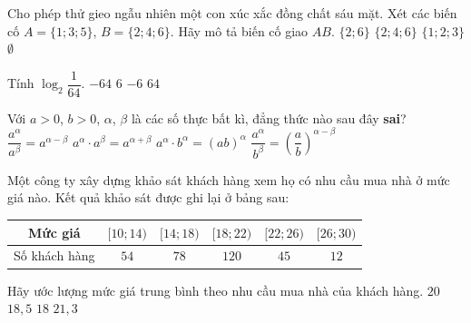 \begin{ex}%
	Cho phép thử gieo ngẫu nhiên một con xúc xắc đồng chất sáu mặt. Xét các biến cố $A=\{1;3;5\}$, $B=\{2;4;6\}$. Hãy mô tả biến cố giao $AB$.
	\choice
	{$\{2;6\}$}
	{$\{2;4;6\}$}
	{$\{1;2;3\}$}
	{\True $\emptyset$}
\end{ex}
\begin{ex}%
	Tính $\log_2\dfrac{1}{64}$.
	\choice
	{$-64$}
	{$6$}
	{\True $-6$}
	{$64$}
\end{ex}
\begin{ex}%
	Với $a>0$, $b>0$, $\alpha$, $\beta$ là các số thực bất kì, đẳng thức nào sau đây {\bf sai}?
	\choice
	{$\dfrac{a^{\alpha}}{a^{\beta}}=a^{\alpha-\beta}$}
	{$a^{\alpha}\cdot a^{\beta}=a^{\alpha+\beta}$}
	{$a^{\alpha}\cdot b^{\alpha}=(ab)^{\alpha}$}
	{\True $\dfrac{a^{\alpha}}{b^{\beta}}=\left(\dfrac{a}{b}\right)^{\alpha-\beta}$}
\end{ex}
\begin{ex}%
	Một công ty xây dựng khảo sát khách hàng xem họ có nhu cầu mua nhà ở mức giá nào. Kết quả khảo sát được ghi lại ở bảng sau:
	\begin{center}
	\begin{tabular}{|c|c|c|c|c|c|}
		\hline
		Mức giá\centering{ (triệu đồng/m$^2$)}  &$[10;14)$  &$[14;18)$  &$[18;22)$  &$[22;26)$  &$[26;30)$  \\
		\hline
		Số khách hàng& $54$  &$78$  &$120$  &$45$  &$12$  \\
		\hline
	\end{tabular}
	\end{center}
	Hãy ước lượng mức giá trung bình theo nhu cầu mua nhà của khách hàng.
	\choice
	{$20$}
	{\True $18{,}5$}
	{$18$}
	{$21{,}3$}
\end{ex}
